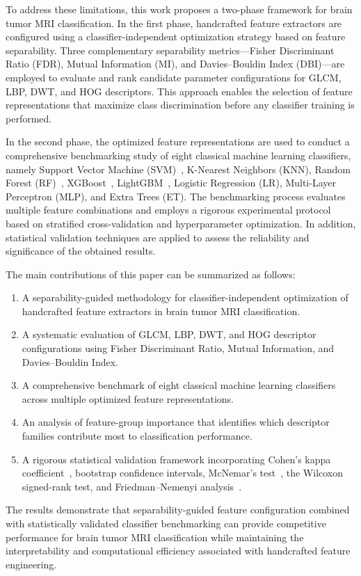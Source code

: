 To address these limitations, this work proposes a two-phase framework for
brain tumor MRI classification. In the first phase, handcrafted feature
extractors are configured using a classifier-independent optimization
strategy based on feature separability. Three complementary separability
metrics---Fisher Discriminant Ratio (FDR), Mutual Information (MI), and
Davies--Bouldin Index (DBI)---are employed to evaluate and rank candidate
parameter configurations for GLCM, LBP, DWT, and HOG descriptors. This
approach enables the selection of feature representations that maximize class
discrimination before any classifier training is performed.

In the second phase, the optimized feature representations are used to
conduct a comprehensive benchmarking study of eight classical machine
learning classifiers, namely Support Vector Machine (SVM)~\cite{cortes1995},
K-Nearest Neighbors (KNN), Random Forest (RF)~\cite{breiman2001},
XGBoost~\cite{chen2016}, LightGBM~\cite{ke2017}, Logistic Regression (LR),
Multi-Layer Perceptron (MLP), and Extra Trees (ET). The benchmarking process
evaluates multiple feature combinations and employs a rigorous experimental
protocol based on stratified cross-validation and hyperparameter
optimization. In addition, statistical validation techniques are applied to
assess the reliability and significance of the obtained results.

The main contributions of this paper can be summarized as follows:
\begin{enumerate}
    \item A separability-guided methodology for classifier-independent
    optimization of handcrafted feature extractors in brain tumor MRI
    classification.
    \item A systematic evaluation of GLCM, LBP, DWT, and HOG descriptor
    configurations using Fisher Discriminant Ratio, Mutual Information, and
    Davies--Bouldin Index.
    \item A comprehensive benchmark of eight classical machine learning
    classifiers across multiple optimized feature representations.
    \item An analysis of feature-group importance that identifies which
    descriptor families contribute most to classification performance.
    \item A rigorous statistical validation framework incorporating Cohen's
    kappa coefficient~\cite{cohen1960}, bootstrap confidence intervals,
    McNemar's test~\cite{mcnemar1947}, the Wilcoxon signed-rank test, and
    Friedman--Nemenyi analysis~\cite{demsar2006}.
\end{enumerate}

The results demonstrate that separability-guided feature configuration
combined with statistically validated classifier benchmarking can provide
competitive performance for brain tumor MRI classification while maintaining
the interpretability and computational efficiency associated with handcrafted
feature engineering.
